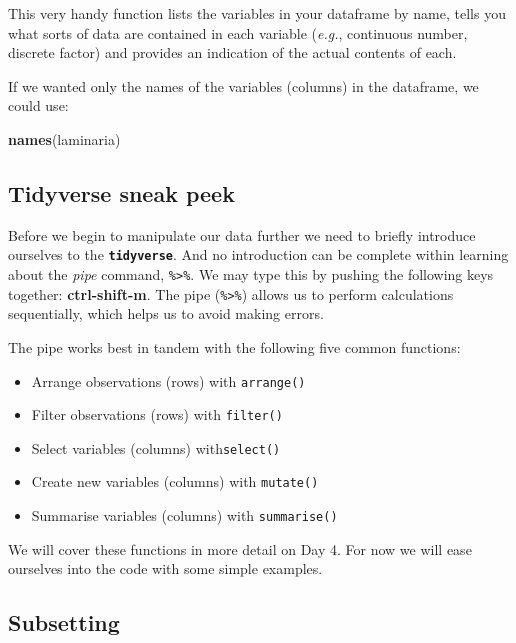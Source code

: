 \documentclass[]{book}
\newenvironment{Shaded}{\begin{snugshade}}{\end{snugshade}}
\newcommand{\KeywordTok}[1]{\textcolor[rgb]{0.13,0.29,0.53}{\textbf{#1}}}
\newcommand{\NormalTok}[1]{#1}
\providecommand{\tightlist}{%
  \setlength{\itemsep}{0pt}\setlength{\parskip}{0pt}}
\theoremstyle{definition}
\theoremstyle{definition}
\theoremstyle{definition}
\theoremstyle{remark}
\begin{document}
This very handy function lists the variables in your dataframe by name,
tells you what sorts of data are contained in each variable
(\emph{e.g.}, continuous number, discrete factor) and provides an
indication of the actual contents of each.

If we wanted only the names of the variables (columns) in the dataframe,
we could use:

\begin{Shaded}
\begin{Highlighting}[]
\KeywordTok{names}\NormalTok{(laminaria)}
\end{Highlighting}
\end{Shaded}

\subsection{Tidyverse sneak peek}\label{tidyverse-sneak-peek}

Before we begin to manipulate our data further we need to briefly
introduce ourselves to the \textbf{\texttt{tidyverse}}. And no
introduction can be complete within learning about the \emph{pipe}
command, \texttt{\%\textgreater{}\%}. We may type this by pushing the
following keys together: \textbf{ctrl-shift-m}. The pipe
(\texttt{\%\textgreater{}\%}) allows us to perform calculations
sequentially, which helps us to avoid making errors.

The pipe works best in tandem with the following five common functions:

\begin{itemize}
\tightlist
\item
  Arrange observations (rows) with \texttt{arrange()}\\
\item
  Filter observations (rows) with \texttt{filter()}\\
\item
  Select variables (columns) with\texttt{select()}\\
\item
  Create new variables (columns) with \texttt{mutate()}\\
\item
  Summarise variables (columns) with \texttt{summarise()}
\end{itemize}

We will cover these functions in more detail on Day 4. For now we will
ease ourselves into the code with some simple examples.

\subsection{Subsetting}\label{subsetting}
\end{document}
